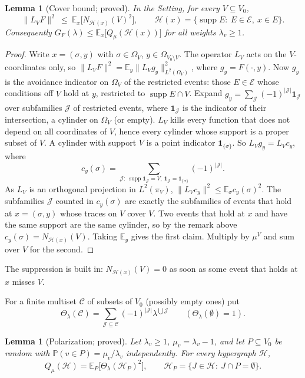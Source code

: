 \documentclass[11pt,reqno]{amsart}
\newtheorem{lemma}[theorem]{Lemma}
\theoremstyle{definition}
\newcommand{\cE}{\mathcal E}
\newcommand{\E}{\mathbb E}
\newcommand{\PP}{\mathbb P}
\newcommand{\supp}{\operatorname{supp}}
\newcommand{\Ho}{\mathcal H}
\newcommand{\cC}{\mathcal C}
\begin{document}
\begin{lemma}[Cover bound; proved]\label{lem:cover}
In the Setting, for every $V\subseteq V_0$,
\[
 \|L_VF\|^2\ \le\ \E_x\big[N_{\Ho(x)}(V)^2\big],\qquad
 \Ho(x)=\{\supp E:\ E\in\cE,\ x\in E\}.
\]
Consequently $G_F(\lambda)\le\E_x\big[Q_\mu(\Ho(x))\big]$ for all weights $\lambda_v\ge1$.
\end{lemma}

\begin{proof}
Write $x=(\sigma,y)$ with $\sigma\in\Omega_V$, $y\in\Omega_{V_0\setminus V}$.  The operator
$L_V$ acts on the $V$-coordinates only, so
$\|L_VF\|^2=\E_y\|L_Vg_y\|^2_{L^2(\Omega_V)}$, where $g_y=F(\cdot,y)$.  Now $g_y$
is the avoidance indicator on $\Omega_V$ of the restricted events: those
$E\in\cE$ whose conditions off $V$ hold at $y$, restricted to $\supp E\cap V$.
Expand $g_y=\sum_{\mathcal J}(-1)^{|\mathcal J|}\mathbf 1_{\mathcal J}$ over subfamilies
$\mathcal J$ of restricted events, where $\mathbf 1_{\mathcal J}$ is the indicator
of their intersection, a cylinder on $\Omega_V$ (or empty).  $L_V$ kills every
function that does not depend on all coordinates of $V$, hence every
cylinder whose support is a proper subset of $V$.  A cylinder with
support $V$ is a point indicator $\mathbf 1_{\{\sigma\}}$.  So $L_Vg_y=L_Vc_y$, where
\[
 c_y(\sigma)=\sum_{\mathcal J:\ \supp\mathbf 1_{\mathcal J}=V,\ \mathbf 1_{\mathcal J}=\mathbf 1_{\{\sigma\}}}(-1)^{|\mathcal J|}.
\]
As $L_V$ is an orthogonal projection in $L^2(\pi_V)$,
$\|L_Vc_y\|^2\le\E_\sigma c_y(\sigma)^2$.  The subfamilies $\mathcal J$ counted in
$c_y(\sigma)$ are exactly the subfamilies of events that hold at $x=(\sigma,y)$
whose traces on $V$ cover $V$.  Two events that hold at $x$ and have the
same support are the same cylinder, so by the remark above
$c_y(\sigma)=N_{\Ho(x)}(V)$.  Taking $\E_y$ gives the first claim.  Multiply by
$\mu^V$ and sum over $V$ for the second.
\end{proof}

The suppression is built in: $N_{\Ho(x)}(V)=0$ as soon as some event that
holds at $x$ misses $V$.

For a finite multiset $\cC$ of subsets of $V_0$ (possibly empty ones) put
\[
 \Theta_\lambda(\cC)=\sum_{\mathcal J\subseteq\cC}(-1)^{|\mathcal J|}\lambda^{\bigcup\mathcal J}\qquad(\Theta_\lambda(\emptyset)=1).
\]

\begin{lemma}[Polarization; proved]\label{lem:polar}
Let $\lambda_v\ge1$, $\mu_v=\lambda_v-1$, and let $P\subseteq V_0$ be random with
$\PP(v\in P)=\mu_v/\lambda_v$ independently.  For every hypergraph $\Ho$,
\[
 Q_\mu(\Ho)=\E_P\big[\Theta_\lambda(\Ho_P)^2\big],\qquad \Ho_P=\{J\in\Ho:\ J\cap P=\emptyset\}.
\]
\end{lemma}
\end{document}
